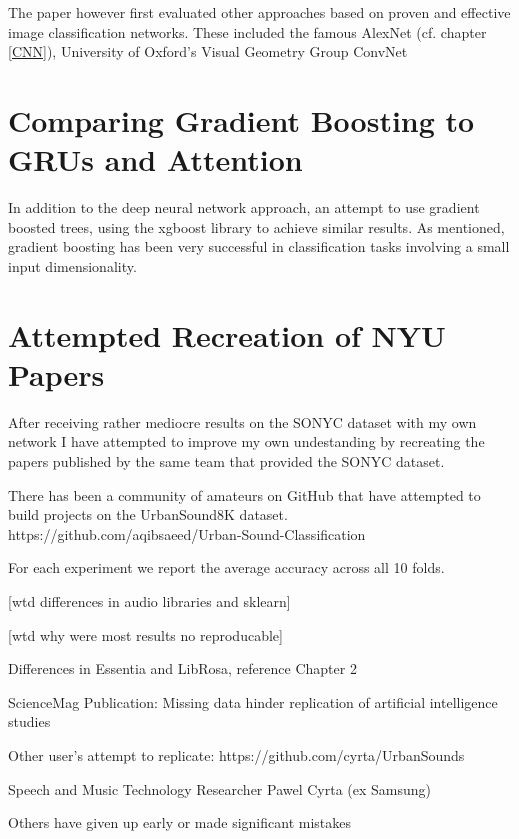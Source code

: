 The paper however first evaluated other approaches based on proven and effective image classification networks. These included the famous AlexNet \cite{AlexNet} (cf. chapter \ref{CNN}), University of Oxford's Visual Geometry Group ConvNet \cite{DBLP:journals/corr/SimonyanZ14a}


\section{Comparing Gradient Boosting to GRUs and Attention}

In addition to the deep neural network approach, an attempt to use gradient boosted trees, using the xgboost library \cite{DBLP:journals/corr/ChenG16} to achieve similar results.  As mentioned, gradient boosting has been very successful in classification tasks involving a small input dimensionality.

\newpage



\section{Attempted Recreation of NYU Papers}

After receiving rather mediocre results on the SONYC dataset with my own network I have attempted to improve my own undestanding by recreating the papers published by the same team that provided the SONYC dataset.

There has been a community of amateurs on GitHub that have attempted to build projects on the UrbanSound8K dataset. https://github.com/aqibsaeed/Urban-Sound-Classification



For each experiment we report the average accuracy across all 10 folds.

[wtd differences in audio libraries and sklearn]

[wtd why were most results no reproducable]

Differences in Essentia and LibRosa, reference Chapter 2



ScienceMag Publication: Missing data hinder replication of artificial intelligence studies

Other user's attempt to replicate: https://github.com/cyrta/UrbanSounds

Speech and Music Technology Researcher Pawel Cyrta (ex Samsung)

Others have given up early or made significant mistakes

